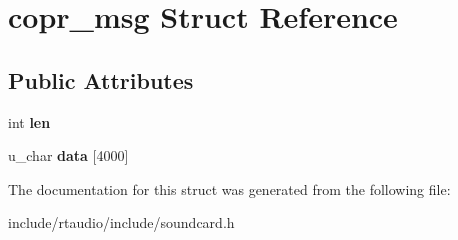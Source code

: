 \hypertarget{structcopr__msg}{}\section{copr\+\_\+msg Struct Reference}
\label{structcopr__msg}
\subsection*{Public Attributes}
\begin{DoxyCompactItemize}
\item 
int {\bfseries len}\hypertarget{structcopr__msg_ad7275a0f389c5d7e7ea7b7b2ad70769f}{}\label{structcopr__msg_ad7275a0f389c5d7e7ea7b7b2ad70769f}

\item 
u\+\_\+char {\bfseries data} \mbox{[}4000\mbox{]}\hypertarget{structcopr__msg_ac363af5ccd3ac18e9a8f8d74acc67130}{}\label{structcopr__msg_ac363af5ccd3ac18e9a8f8d74acc67130}

\end{DoxyCompactItemize}


The documentation for this struct was generated from the following file\+:\begin{DoxyCompactItemize}
\item 
include/rtaudio/include/soundcard.\+h\end{DoxyCompactItemize}
